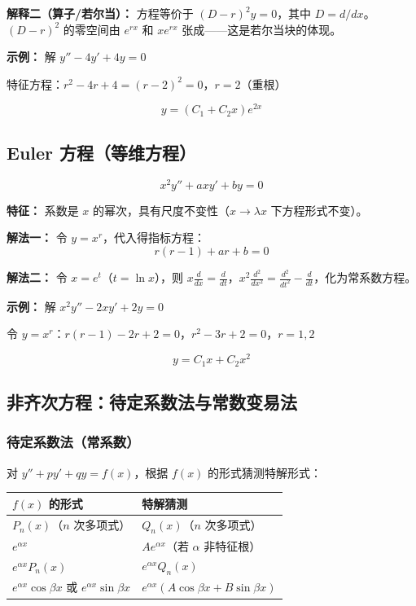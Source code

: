 \textbf{解释二（算子/若尔当）：} 方程等价于 $(D - r)^2 y = 0$，其中 $D = d/dx$。$(D-r)^2$ 的零空间由 $e^{rx}$ 和 $xe^{rx}$ 张成——这是若尔当块的体现。

\textbf{示例：} 解 $y'' - 4y' + 4y = 0$

特征方程：$r^2 - 4r + 4 = (r-2)^2 = 0$，$r = 2$（重根）

\[
\boxed{y = (C_1 + C_2 x)e^{2x}}
\]

\subsection{Euler 方程（等维方程）}

\[
x^2 y'' + axy' + by = 0
\]

\textbf{特征：} 系数是 $x$ 的幂次，具有尺度不变性（$x \to \lambda x$ 下方程形式不变）。

\textbf{解法一：} 令 $y = x^r$，代入得指标方程：
\[
r(r-1) + ar + b = 0
\]

\textbf{解法二：} 令 $x = e^t$（$t = \ln x$），则 $x\frac{d}{dx} = \frac{d}{dt}$，$x^2\frac{d^2}{dx^2} = \frac{d^2}{dt^2} - \frac{d}{dt}$，化为常系数方程。

\textbf{示例：} 解 $x^2 y'' - 2xy' + 2y = 0$

令 $y = x^r$：$r(r-1) - 2r + 2 = 0$，$r^2 - 3r + 2 = 0$，$r = 1, 2$

\[
\boxed{y = C_1 x + C_2 x^2}
\]

\subsection{非齐次方程：待定系数法与常数变易法}

\subsubsection{待定系数法（常系数）}

对 $y'' + py' + qy = f(x)$，根据 $f(x)$ 的形式猜测特解形式：

\begin{center}
\begin{tabular}{p{4cm}p{5cm}}
\toprule
\textbf{$f(x)$ 的形式} & \textbf{特解猜测} \\
\midrule
$P_n(x)$（$n$ 次多项式） & $Q_n(x)$（$n$ 次多项式） \\
$e^{\alpha x}$ & $Ae^{\alpha x}$（若 $\alpha$ 非特征根） \\
$e^{\alpha x}P_n(x)$ & $e^{\alpha x}Q_n(x)$ \\
$e^{\alpha x}\cos\beta x$ 或 $e^{\alpha x}\sin\beta x$ & $e^{\alpha x}(A\cos\beta x + B\sin\beta x)$ \\
\bottomrule
\end{tabular}
\end{center}

